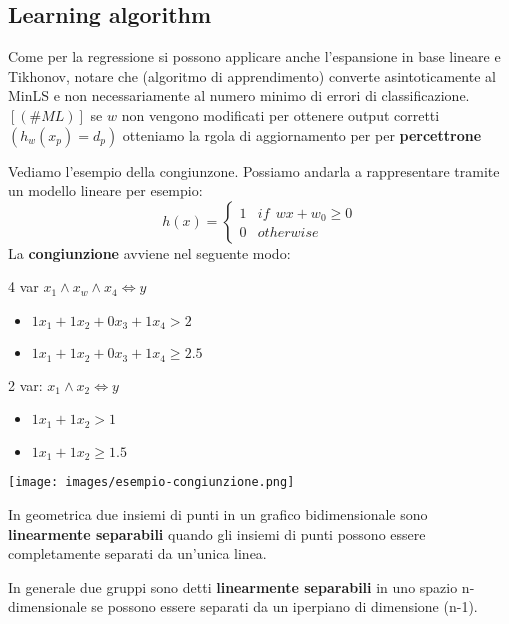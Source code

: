 \subsection{Learning algorithm}
Come per la regressione si possono applicare anche l'espansione in base lineare e Tikhonov, notare che (algoritmo di apprendimento) converte asintoticamente al MinLS e non
necessariamente al numero minimo di errori di classificazione. $[(\#ML)]$ se $w$ non vengono modificati per ottenere output corretti $(h_w(x_p) = d_p)$ otteniamo la rgola di aggiornamento per per \textbf{percettrone}
\begin{example}
    Vediamo l'esempio della congiunzone. Possiamo andarla a rappresentare tramite un modello lineare per esempio:
    $$h(x) = 
    \begin{cases}
        1 & if\:\: wx + w_0 \geq 0\\
        0 & otherwise
    \end{cases}
    $$
    La \textbf{congiunzione} avviene nel seguente modo: \\
    \begin{minipage}{.5\linewidth}
        4 var $x_1 \land x_w \land x_4 \Leftrightarrow y$
        \begin{itemize}
            \item $1x_1 + 1 x_2 + 0 x_3 + 1 x_4 > 2$
            \item $1x_1 + 1 x_2 + 0 x_3 + 1 x_4 \geq 2.5$
        \end{itemize}
        2 var: $x_1 \land x_2 \Leftrightarrow y$
        \begin{itemize}
            \item $1 x_1 + 1 x_2 > 1$
            \item $1 x_1 + 1 x_2 \geq 1.5$
        \end{itemize}
    \end{minipage}
    \hfill
    \begin{minipage}{.5\linewidth}
        \centering
        \texttt{[image: images/esempio-congiunzione.png]}
    \end{minipage}
\end{example}
\hspace{-15pt}In geometrica due insiemi di punti in un grafico bidimensionale sono \textbf{linearmente separabili} quando gli insiemi
di punti possono essere completamente separati da un'unica linea.
\begin{definition}
    In generale due gruppi sono detti \textbf{linearmente separabili} in uno spazio n-dimensionale se possono essere separati da un iperpiano di dimensione (n-1).
\end{definition}
